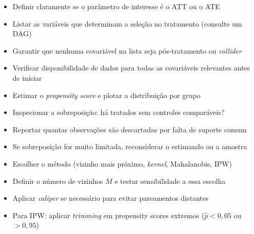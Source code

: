 \documentclass[12pt,a4paper]{article}
\begin{document}
\begin{tcolorbox}[colback=salmonbg, colframe=salmonframe, boxrule=0.5pt, arc=2pt,
  title={\bfseries Etapa 1 — Definir o estimando e verificar a CIA (Seções 2--3)},
  coltitle=black, fonttitle=\bfseries, left=6pt, right=6pt]
\begin{itemize}[leftmargin=1.2em, itemsep=2pt]
  \item[$\square$] Definir claramente se o parâmetro de interesse é o ATT ou o ATE
  \item[$\square$] Listar as variáveis que determinam a seleção no tratamento (consulte um DAG)
  \item[$\square$] Garantir que nenhuma covariável na lista seja pós-tratamento ou \textit{collider}
  \item[$\square$] Verificar disponibilidade de dados para todas as covariáveis relevantes antes de iniciar
\end{itemize}
\end{tcolorbox}

\vspace{0.3cm}

\begin{tcolorbox}[colback=bluebg, colframe=blueframe, boxrule=0.5pt, arc=2pt,
  title={\bfseries Etapa 2 — Verificar o suporte comum (Seção 5.2.1)},
  coltitle=white, fonttitle=\bfseries, left=6pt, right=6pt]
\begin{itemize}[leftmargin=1.2em, itemsep=2pt]
  \item[$\square$] Estimar o \textit{propensity score} e plotar a distribuição por grupo
  \item[$\square$] Inspecionar a sobreposição: há tratados sem controles comparáveis?
  \item[$\square$] Reportar quantas observações são descartadas por falta de suporte comum
  \item[$\square$] Se sobreposição for muito limitada, reconsiderar o estimando ou a amostra
\end{itemize}
\end{tcolorbox}

\vspace{0.3cm}

\begin{tcolorbox}[colback=salmonbg, colframe=salmonframe, boxrule=0.5pt, arc=2pt,
  title={\bfseries Etapa 3 — Executar o pareamento (Seções 4--5)},
  coltitle=black, fonttitle=\bfseries, left=6pt, right=6pt]
\begin{itemize}[leftmargin=1.2em, itemsep=2pt]
  \item[$\square$] Escolher o método (vizinho mais próximo, \textit{kernel}, Mahalanobis, IPW)
  \item[$\square$] Definir o número de vizinhos $M$ e testar sensibilidade a essa escolha
  \item[$\square$] Aplicar \textit{caliper} se necessário para evitar pareamentos distantes
  \item[$\square$] Para IPW: aplicar \textit{trimming} em propensity scores extremos ($\hat{p} < 0{,}05$ ou $> 0{,}95$)
\end{itemize}
\end{tcolorbox}
\end{document}
